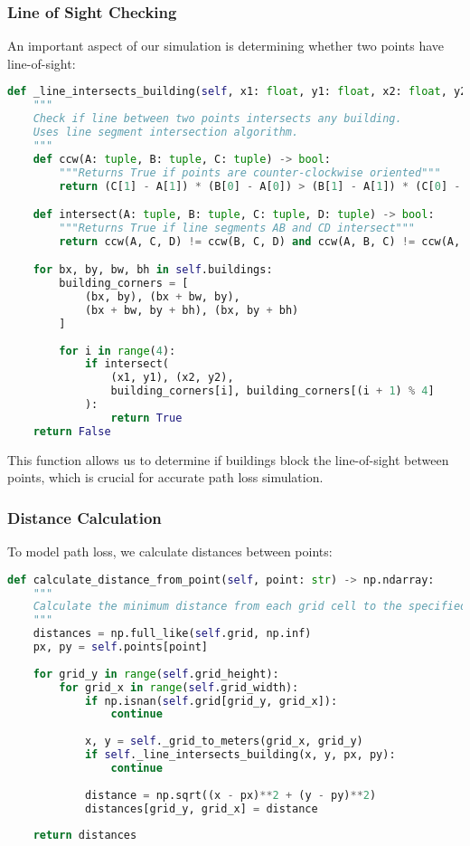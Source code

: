 \subsubsection{Line of Sight Checking}

An important aspect of our simulation is determining whether two points have line-of-sight:

\begin{lstlisting}[language=python, caption={Line of Sight Checking}]
def _line_intersects_building(self, x1: float, y1: float, x2: float, y2: float) -> bool:
    """
    Check if line between two points intersects any building.
    Uses line segment intersection algorithm.
    """
    def ccw(A: tuple, B: tuple, C: tuple) -> bool:
        """Returns True if points are counter-clockwise oriented"""
        return (C[1] - A[1]) * (B[0] - A[0]) > (B[1] - A[1]) * (C[0] - A[0])

    def intersect(A: tuple, B: tuple, C: tuple, D: tuple) -> bool:
        """Returns True if line segments AB and CD intersect"""
        return ccw(A, C, D) != ccw(B, C, D) and ccw(A, B, C) != ccw(A, B, D)

    for bx, by, bw, bh in self.buildings:
        building_corners = [
            (bx, by), (bx + bw, by),
            (bx + bw, by + bh), (bx, by + bh)
        ]
        
        for i in range(4):
            if intersect(
                (x1, y1), (x2, y2),
                building_corners[i], building_corners[(i + 1) % 4]
            ):
                return True
    return False
\end{lstlisting}

This function allows us to determine if buildings block the line-of-sight between points, which is crucial for accurate path loss simulation.

\subsubsection{Distance Calculation}

To model path loss, we calculate distances between points:

\begin{lstlisting}[language=python, caption={Distance Calculation}]
def calculate_distance_from_point(self, point: str) -> np.ndarray:
    """
    Calculate the minimum distance from each grid cell to the specified point.
    """
    distances = np.full_like(self.grid, np.inf)
    px, py = self.points[point]
    
    for grid_y in range(self.grid_height):
        for grid_x in range(self.grid_width):
            if np.isnan(self.grid[grid_y, grid_x]):
                continue
                
            x, y = self._grid_to_meters(grid_x, grid_y)
            if self._line_intersects_building(x, y, px, py):
                continue
                
            distance = np.sqrt((x - px)**2 + (y - py)**2)
            distances[grid_y, grid_x] = distance
            
    return distances
\end{lstlisting}

